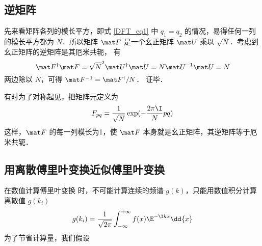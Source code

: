 \subsection{逆矩阵}
先来看矩阵各列的模长平方，即式 \eqref{DFT_eq1} 中 $q_1=q_2$ 的情况，易得任何一列的模长平方都为 $N$．所以矩阵 $\mat F$ 是一个幺正矩阵 $\mat U$ 乘以 $\sqrt{N}$．考虑到幺正矩阵的逆矩阵是其厄米共轭， %
有
\begin{equation}
\mat F^\dag \mat F = \sqrt{N}^2 \mat U^\dag \mat U = N \mat U^{-1} \mat U = N
\end{equation}
两边除以 $N$，可得 $\mat F^{-1} = \mat F^\dag /N$． 证毕．

有时为了对称起见，把矩阵元定义为
\begin{equation}
F_{pq} = \frac{1}{\sqrt{N}}\exp(-\frac{2\pi\I}{N} p q)
\end{equation}
这样，$\mat F$ 的每一列模长为1，使 $\mat F$ 本身就是幺正矩阵，其逆矩阵等于厄米共轭．

\subsection{用离散傅里叶变换近似傅里叶变换}
在数值计算傅里叶变换 %
时，不可能计算连续的频谱 $g(k)$，只能用数值积分计算离散值 $g(k_i)$
\begin{equation}
g(k_i) = \frac{1}{\sqrt{2\pi}} \int_{-\infty}^{+\infty} f(x)\E^{-\I kx} \dd{x}
\end{equation}
为了节省计算量，我们假设

